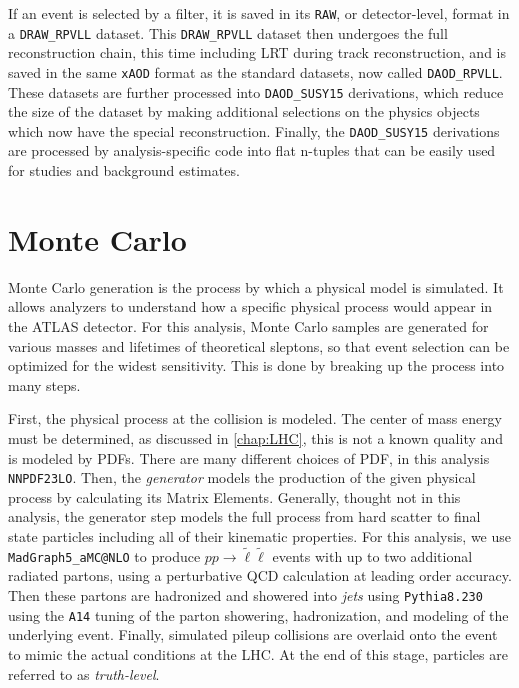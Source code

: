 If an event is selected by a filter, it is saved in its \texttt{RAW}, or detector-level, format in a \texttt{DRAW\_RPVLL} dataset. This \texttt{DRAW\_RPVLL} dataset then undergoes the full reconstruction chain, this time including \ac{LRT} during track reconstruction, and is saved in the same \texttt{xAOD} format as the standard datasets, now called \texttt{DAOD\_RPVLL}. These datasets are further processed into \texttt{DAOD\_SUSY15} derivations, which reduce the size of the dataset by making additional selections on the physics objects which now have the special reconstruction. Finally, the \texttt{DAOD\_SUSY15} derivations are processed by analysis-specific code into flat n-tuples that can be easily used for studies and background estimates. 

\section{Monte Carlo}

Monte Carlo generation is the process by which a physical model is simulated. It allows analyzers to understand how a specific physical process would appear in the \ac{ATLAS} detector. For this analysis, Monte Carlo samples are generated for various masses and lifetimes of theoretical sleptons, so that event selection can be optimized for the widest sensitivity. This is done by breaking up the process into many steps. 


First, the physical process at the collision is modeled. The center of mass energy must be determined, as discussed in \autoref{chap:LHC}, this is not a known quality and is modeled by \ac{PDF}s. There are many different choices of \ac{PDF}, in this analysis \texttt{NNPDF23LO}. Then, the \emph{generator} models the production of the given physical process by calculating its Matrix Elements. Generally, thought not in this analysis, the generator step models the full process from hard scatter to final state particles including all of their kinematic properties. For this analysis, we use \texttt{MadGraph5\_aMC@NLO} to produce $pp \rightarrow \tilde{\ell}\tilde{\ell}$ events with up to two additional radiated partons, using a perturbative \ac{QCD} calculation at leading order accuracy. Then these partons are hadronized and showered into \emph{jets} using \texttt{Pythia8.230} using the \texttt{A14} tuning of the parton showering, hadronization, and modeling of the underlying event. Finally, simulated pileup collisions are overlaid onto the event to mimic the actual conditions at the \ac{LHC}. At the end of this stage, particles are referred to as \emph{truth-level}.


